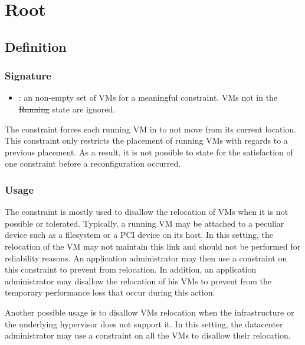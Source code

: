 \section{Root}
\subsection{Definition}

\subsubsection{Signature} 
\begin{itemize}
\item {} : an non-empty set of VMs for a meaningful constraint. VMs not in the \st{Running} state are ignored.
\end{itemize}

The  constraint forces each running VM in  to not move from its current location.
%
This constraint only restricts the placement of running VMs with regards to a previous placement.
As a result, it is not possible to state for the satisfaction of one  constraint before a reconfiguration occurred.



\subsubsection{Usage}

The  constraint is mostly used to disallow the relocation of VMs when it is not possible or tolerated.
Typically, a running VM may be attached to a peculiar device such as a filesystem or a PCI device on its host.
In this setting, the relocation of the VM may not  maintain this link and should not be performed for reliability reasons.
An application administrator may then use a  constraint on this constraint to prevent from relocation.
In addition, an application administrator may disallow the relocation of his VMs to prevent from the temporary performance loss that occur during this action.

Another possible usage is to disallow VMs relocation when the infrastructure or the underlying hypervisor does
not support it. In this setting, the datacenter administrator may use a  constraint on all the VMs to disallow their relocation.

